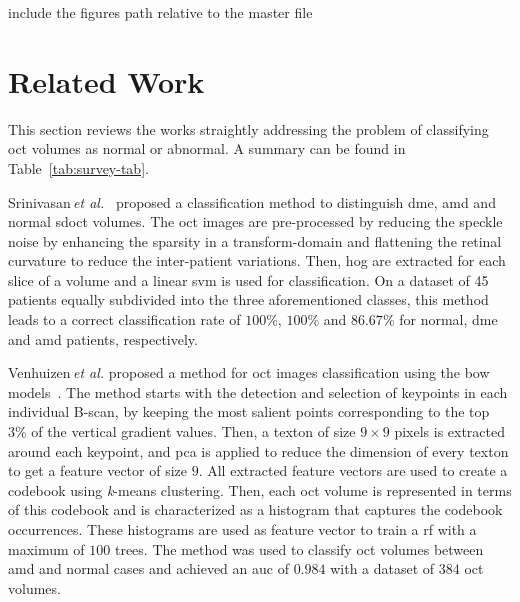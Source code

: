 include the figures path relative to the master file
\graphicspath{ {./content/survey/figures/} }

\section{Related Work}\label{sec:rw}
This section reviews the works straightly addressing the problem of classifying \gls{oct} volumes as normal or abnormal. A summary can be found in Table~\ref{tab:survey-tab}.

Srinivasan\,\textit{et al.}~\cite{Srinivasan2014} proposed a classification method to distinguish \gls{dme}, \gls{amd} and normal \gls{sdoct} volumes.
The \gls{oct} images are pre-processed by reducing the speckle noise by enhancing the sparsity in a transform-domain and flattening the retinal curvature to reduce the inter-patient variations.
Then, \gls{hog} are extracted for each slice of a volume and a linear \gls{svm} is used for classification.
On a dataset of 45 patients equally subdivided into the three aforementioned classes, this method leads to a correct classification rate of $100 \%$, $100 \%$ and $86.67 \%$ for normal, \gls{dme} and \gls{amd} patients, respectively.

Venhuizen\,\textit{et al.} proposed a method for \gls{oct} images classification using the \gls{bow} models~\cite{Venhuizen2015}.
The method starts with the detection and selection of keypoints in each individual B-scan, by keeping the most salient points corresponding to the top $3 \%$ of the vertical gradient values. Then, a texton of size $9 \times 9$ pixels is extracted around each keypoint, and \gls{pca} is applied to reduce the dimension of every texton to get a feature vector of size $9$.
All extracted feature vectors are used to create a codebook using \textit{k}-means clustering.
Then, each \gls{oct} volume is represented in terms of this codebook and is characterized as a histogram that captures the codebook occurrences.
These histograms are used as feature vector to train a \gls{rf} with a maximum of $100$ trees.
The method was used to classify \gls{oct} volumes between \gls{amd} and normal cases and achieved an \gls{auc} of $0.984$ with a dataset of $384$ \gls{oct} volumes.

